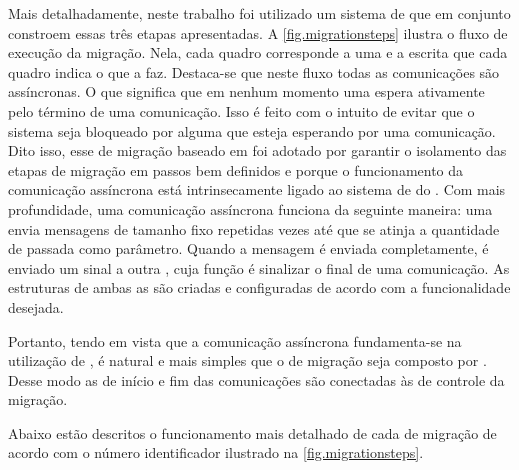 Mais detalhadamente, neste trabalho foi utilizado um sistema de \tasks que em conjunto constroem essas três etapas apresentadas. A \autoref{fig.migrationsteps} ilustra o fluxo de execução da migração. Nela, cada quadro corresponde a uma \task e a escrita que cada quadro indica o que a \task faz. Destaca-se que neste fluxo todas as comunicações são assíncronas. O que significa que em nenhum momento uma \task espera ativamente pelo término de uma comunicação. Isso é feito com o intuito de evitar que o sistema seja bloqueado por alguma \task que esteja esperando por uma comunicação. Dito isso, esse \design de migração baseado em \tasks foi adotado por garantir o isolamento das etapas de migração em passos bem definidos e porque o funcionamento da comunicação assíncrona está intrinsecamente ligado ao sistema de \tasks do \nanvix. Com mais profundidade, uma comunicação assíncrona funciona da seguinte maneira: uma \task envia mensagens de tamanho fixo repetidas vezes até que se atinja a quantidade de \bytes passada como parâmetro. Quando a mensagem é enviada completamente, é enviado um sinal a outra \task, cuja função é sinalizar o final de uma comunicação. As estruturas de ambas as \tasks são criadas e configuradas de acordo com a funcionalidade desejada.

Portanto, tendo em vista que a comunicação assíncrona fundamenta-se na utilização de \tasks, é natural e mais simples que o \daemon de migração seja composto por \tasks. Desse modo as \tasks de início e fim das comunicações são conectadas às \tasks de controle da migração.

Abaixo estão descritos o funcionamento mais detalhado de cada \task de migração de acordo com o número identificador ilustrado na \autoref{fig.migrationsteps}.


